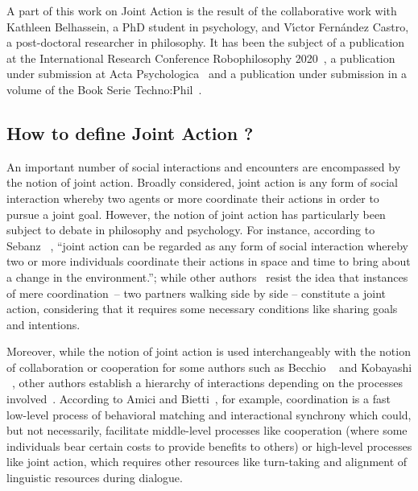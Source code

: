 \documentclass[a4paper,11pt,twoside]{StyleThese}
\begin{document}
A part of this work on Joint Action is the result of the collaborative work with Kathleen Belhassein, a PhD student in psychology, and V{\'\i}ctor Fern{\'a}ndez Castro, a post-doctoral researcher in philosophy. It has been the subject of a publication at the International Research Conference Robophilosophy 2020~\cite{belhassein_2020_horizontal}, a publication under submission at Acta Psychologica~\cite{belhassein_2021_adressing} and a publication under submission in a volume of the Book Serie Techno:Phil~\cite{castro_2021_adressing}.

\subsection{How to define Joint Action ?}

An important number of social interactions and encounters are encompassed by the notion of joint action. Broadly considered, joint action is any form of social interaction whereby two agents or more coordinate their actions in order to pursue a joint goal. However, the notion of joint action has particularly been subject to debate in philosophy and psychology. For instance, according to Sebanz \etal~\cite[p.~70]{sebanz_2006_joint}, ``joint action can be regarded as
any form of social interaction whereby two or more individuals coordinate their actions in space and time to bring about a change in the environment.''; while other authors~\cite{carpenter_2009_just, cohen_1991_teamwork, fiebich_2013_joint, tomasello_2005_understanding,pacherie_2012_agency} resist the idea that instances of mere coordination – \eg two partners walking side by side – constitute a joint action, considering that it requires some necessary conditions like sharing goals and intentions.

Moreover, while the notion of joint action is used interchangeably with the notion of collaboration or cooperation for some authors such as Becchio \etal~\cite{becchio_2010_toward} and Kobayashi \etal~\cite{kobayashi_2018_language}, other authors establish a hierarchy of interactions depending on the processes involved~\cite{amici_2015_coordination, chalmeau_1995_cooperation}. According to Amici and Bietti~\cite{amici_2015_coordination}, for example, coordination is a fast low-level process of behavioral matching and interactional synchrony which could, but not necessarily, facilitate middle-level processes like cooperation (where some individuals bear certain costs to provide benefits to others) or high-level processes like joint action, which requires other resources like turn-taking and alignment of linguistic resources during dialogue.
\end{document}
